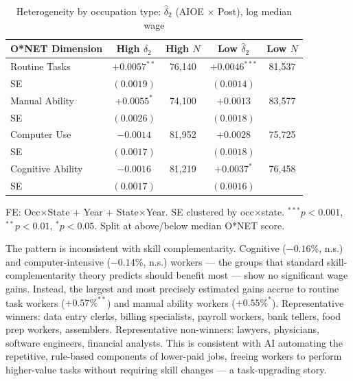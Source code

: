 \documentclass[12pt,a4paper]{article}
\begin{document}
\begin{table}[H]
\centering
\caption{Heterogeneity by occupation type: $\hat\delta_2$ (AIOE $\times$ Post), log median wage}
\label{tab:het}
\small
\begin{tabular}{lcccc}
\toprule
\textbf{O*NET Dimension} & \textbf{High $\hat\delta_2$} & \textbf{High $N$} & \textbf{Low $\hat\delta_2$} & \textbf{Low $N$} \\
\midrule
Routine Tasks     & $+0.0057^{**}$  & 76,140 & $+0.0046^{***}$ & 81,537 \\
SE                & $(0.0019)$      &        & $(0.0014)$      & \\[3pt]
Manual Ability    & $+0.0055^{*}$   & 74,100 & $+0.0013$       & 83,577 \\
SE                & $(0.0026)$      &        & $(0.0018)$      & \\[3pt]
Computer Use      & $-0.0014$       & 81,952 & $+0.0028$       & 75,725 \\
SE                & $(0.0017)$      &        & $(0.0018)$      & \\[3pt]
Cognitive Ability & $-0.0016$       & 81,219 & $+0.0037^{*}$   & 76,458 \\
SE                & $(0.0017)$      &        & $(0.0016)$      & \\
\bottomrule
\end{tabular}
\begin{flushleft}
\footnotesize FE: Occ$\times$State + Year + State$\times$Year. SE clustered by occ$\times$state. $^{***}p<0.001$, $^{**}p<0.01$, $^{*}p<0.05$. Split at above/below median O*NET score.
\end{flushleft}
\end{table}

The pattern is inconsistent with skill complementarity. Cognitive ($-0.16\%$, n.s.) and computer-intensive ($-0.14\%$, n.s.) workers — the groups that standard skill-complementarity theory predicts should benefit most — show no significant wage gains. Instead, the largest and most precisely estimated gains accrue to routine task workers ($+0.57\%^{**}$) and manual ability workers ($+0.55\%^{*}$). Representative winners: data entry clerks, billing specialists, payroll workers, bank tellers, food prep workers, assemblers. Representative non-winners: lawyers, physicians, software engineers, financial analysts. This is consistent with AI automating the repetitive, rule-based components of lower-paid jobs, freeing workers to perform higher-value tasks without requiring skill changes — a task-upgrading story.
\end{document}
